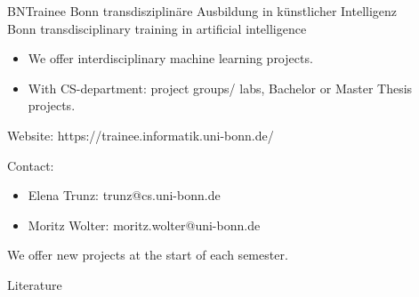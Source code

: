 \documentclass{beamer}
\begin{document}
    \begin{frame}{BNTrainee}
      Bonn transdisziplinäre Ausbildung in künstlicher Intelligenz \\
      Bonn transdisciplinary training in artificial intelligence
      \begin{itemize}
        \item We offer interdisciplinary machine learning projects.
        \item With CS-department: project groups/ labs, Bachelor or Master Thesis projects.
      \end{itemize}
      Website: https://trainee.informatik.uni-bonn.de/
      
      Contact:
      \begin{itemize}
        \item Elena Trunz: trunz@cs.uni-bonn.de
        \item Moritz Wolter: moritz.wolter@uni-bonn.de
      \end{itemize}
      We offer new projects at the start of each semester.
      \end{frame}
  

    \begin{frame}[allowframebreaks]{Literature}
      \printbibliography
    \end{frame}
\end{document}
